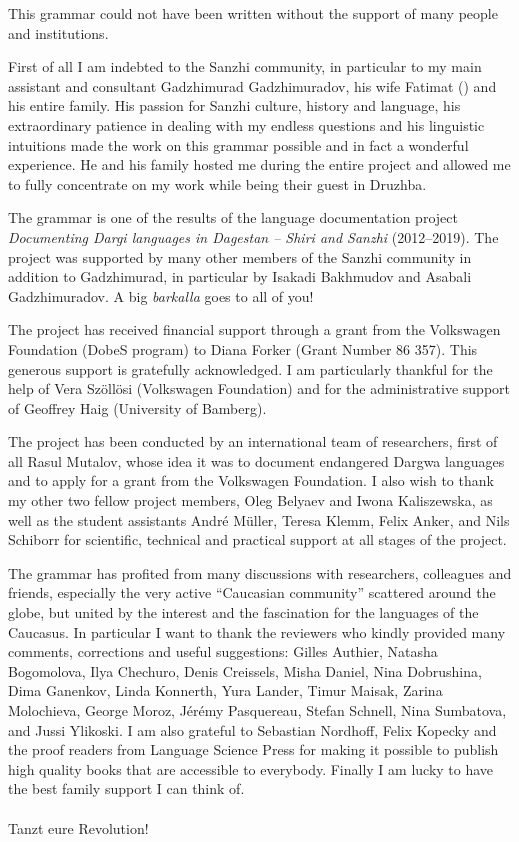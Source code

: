 \largerpage
This grammar could not have been written without the support of many people and institutions.

First of all I am indebted to the Sanzhi community, in particular to my main assistant and consultant Gadzhimurad Gadzhimuradov, his wife Fatimat () and his entire family. His passion for Sanzhi culture, history and language, his extraordinary patience in dealing with my endless questions and his linguistic intuitions made the work on this grammar possible and in fact a wonderful experience. He and his family hosted me during the entire project and allowed me to fully concentrate on my work while being their guest in Druzhba.

The grammar is one of the results of the language documentation project \textit{Documenting Dargi languages in Dagestan -- Shiri and Sanzhi} (2012--2019). The project was supported by many other members of the Sanzhi community in addition to Gadzhimurad, in particular by Isakadi Bakhmudov and Asabali Gadzhimuradov. A big \textit{barkalla} goes to all of you!

The project has received financial support through a grant from the Volkswagen Foundation (DobeS program) to Diana Forker (Grant Number 86 357). This generous support is gratefully acknowledged. I am particularly thankful for the help of Vera Szöllösi (Volkswagen Foundation) and for the administrative support of Geoffrey Haig (University of Bamberg).

The project has been conducted by an international team of researchers, first of all Rasul Mutalov, whose idea it was to document endangered Dargwa languages and to apply for a grant from the Volkswagen Foundation. I also wish to thank my other two fellow project members, Oleg Belyaev and Iwona Kaliszewska, as well as the student assistants André Müller, Teresa Klemm, Felix Anker, and Nils Schiborr for scientific, technical and practical support at all stages of the project.

The grammar has profited from many discussions with researchers, colleagues and friends, especially the very active ``Caucasian community'' scattered around the globe, but united by the interest and the fascination for the languages of the Caucasus. In particular I want to thank the reviewers who kindly provided many comments, corrections and useful suggestions: Gilles Authier, Natasha Bogomolova, Ilya Chechuro, Denis Creissels, Misha Daniel, Nina Dobrushina, Dima Ganenkov, Linda Konnerth, Yura Lander, Timur Maisak, Zarina Molochieva, George Moroz, Jérémy Pasquereau, Stefan Schnell, Nina Sumbatova, and Jussi Ylikoski. I am also grateful to Sebastian Nordhoff, Felix Kopecky and the proof readers from Language Science Press for making it possible to publish high quality books that are accessible to everybody. Finally I am lucky to have the best family support I can think of.
\\\\
Tanzt eure Revolution!
